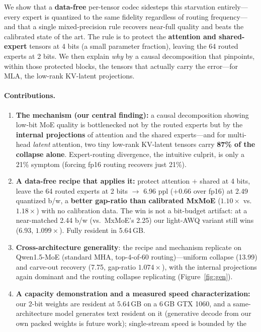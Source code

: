 \documentclass[10pt]{article}
\begin{document}
We show that a \textbf{data-free} per-tensor codec sidesteps this starvation entirely---every expert is
quantized to the same fidelity regardless of routing frequency---and that a single mixed-precision rule
recovers near-full quality and beats the calibrated state of the art. The rule is to protect the
\textbf{attention and shared-expert} tensors at 4 bits (a small parameter fraction), leaving the 64
routed experts at 2 bits. We then explain \emph{why} by a causal decomposition that pinpoints, within
those protected blocks, the tensors that actually carry the error---for MLA, the low-rank KV-latent
projections.

\paragraph{Contributions.}
\begin{enumerate}\itemsep1pt
\item \textbf{The mechanism (our central finding):} a causal decomposition showing low-bit MoE quality
is bottlenecked not by the routed experts but by the \textbf{internal projections} of attention and the
shared experts---and for multi-head \emph{latent} attention, two tiny low-rank KV-latent tensors carry
\textbf{87\% of the collapse alone}. Expert-routing divergence, the intuitive culprit, is only a 21\%
symptom (forcing fp16 routing recovers just 21\%).
\item \textbf{A data-free recipe that applies it:} protect attention $+$ shared at 4 bits, leave the 64
routed experts at 2 bits $\to$ 6.96 ppl ($+0.66$ over fp16) at 2.49 quantized b/w, a \textbf{better gap-ratio than
calibrated MxMoE} ($1.10\times$ vs.\ $1.18\times$) with no calibration data. The win is not a
bit-budget artifact: at a near-matched 2.44 b/w (vs.\ MxMoE's 2.25) our light-AWQ variant still wins
(6.93, $1.099\times$). Fully resident in 5.64\,GB.
\item \textbf{Cross-architecture generality}: the recipe and mechanism replicate on Qwen1.5-MoE (standard
MHA, top-4-of-60 routing)---uniform collapse (13.99) and carve-out recovery (7.75, gap-ratio
$1.074\times$), with the internal projections again dominant and the routing collapse replicating (Figure~\ref{fig:gen}).
\item \textbf{A capacity demonstration and a measured speed characterization:} our 2-bit weights are
resident at 5.64\,GB on a 6\,GB GTX 1060, and a same-architecture model generates text resident on it
(generative decode from our own packed weights is future work); single-stream speed is bounded by the

\end{enumerate}
\end{document}
